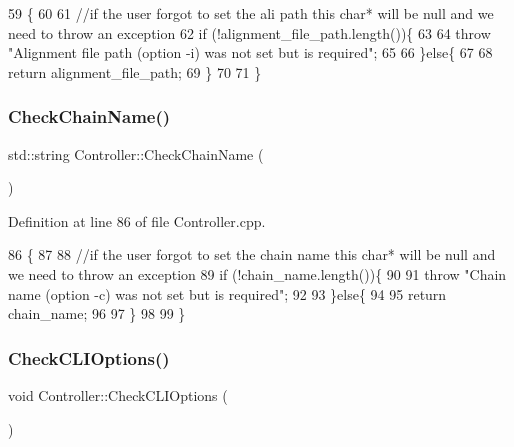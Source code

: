 \begin{DoxyCode}
59                                              \{
60   
61   \textcolor{comment}{//if the user forgot to set the ali path this char* will be null and we need to throw an exception}
62   \textcolor{keywordflow}{if} (!alignment\_file\_path.length())\{
63     
64     \textcolor{keywordflow}{throw} \textcolor{stringliteral}{"Alignment file path (option -i) was not set but is required"};
65     
66   \}\textcolor{keywordflow}{else}\{
67   
68     \textcolor{keywordflow}{return} alignment\_file\_path;
69   \}
70   
71 \}
\end{DoxyCode}
\mbox{\label{classController_a207236dbade67acf265531bfa7769056}} 
\subsubsection{\texorpdfstring{Check\+Chain\+Name()}{CheckChainName()}}
{\footnotesize\ttfamily std\+::string Controller\+::\+Check\+Chain\+Name (\begin{DoxyParamCaption}{ }\end{DoxyParamCaption})}



Definition at line 86 of file Controller.\+cpp.


\begin{DoxyCode}
86                                      \{
87   
88   \textcolor{comment}{//if the user forgot to set the chain name this char* will be null and we need to throw an exception}
89   \textcolor{keywordflow}{if} (!chain\_name.length())\{
90     
91     \textcolor{keywordflow}{throw} \textcolor{stringliteral}{"Chain name (option -c) was not set but is required"};
92     
93   \}\textcolor{keywordflow}{else}\{
94   
95     \textcolor{keywordflow}{return} chain\_name;
96     
97   \}
98   
99 \}
\end{DoxyCode}
\mbox{\label{classController_a1307438a1590b0deff238e4ee46aaed3}} 
\subsubsection{\texorpdfstring{Check\+C\+L\+I\+Options()}{CheckCLIOptions()}}
{\footnotesize\ttfamily void Controller\+::\+Check\+C\+L\+I\+Options (\begin{DoxyParamCaption}{ }\end{DoxyParamCaption})}



